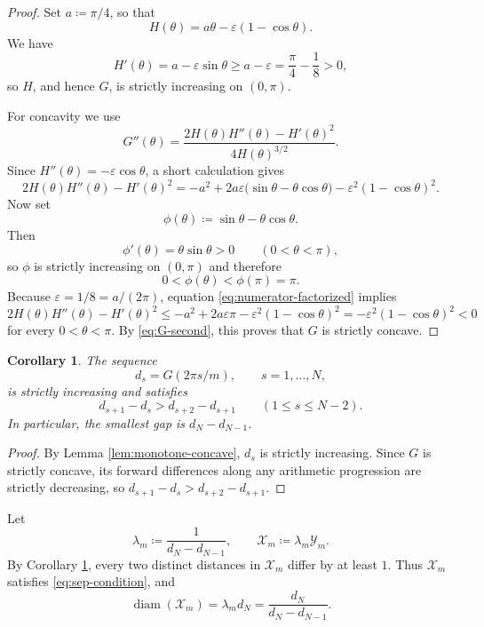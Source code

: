 \documentclass[twoside, reqno, 12pt]{amsart}
\newtheorem{corollary}[theorem]{Corollary}
\theoremstyle{definition}
\theoremstyle{remark}
\DeclareMathOperator{\diam}{diam}
\begin{document}
\begin{proof}
Set $a\coloneqq\pi/4$, so that
\[
H(\theta)=a\theta-\varepsilon(1-\cos\theta).
\]
We have
\[
H'(\theta)=a-\varepsilon\sin\theta\ge a-\varepsilon=\frac{\pi}{4}-\frac18>0,
\]
so $H$, and hence $G$, is strictly increasing on $(0,\pi)$.

For concavity we use
\begin{equation}\label{eq:G-second}
G''(\theta)=\frac{2H(\theta)H''(\theta)-H'(\theta)^2}{4H(\theta)^{3/2}}.
\end{equation}
Since $H''(\theta)=-\varepsilon\cos\theta$, a short calculation gives
\begin{equation}\label{eq:numerator-factorized}
2H(\theta)H''(\theta)-H'(\theta)^2
=-a^2+2a\varepsilon\bigl(\sin\theta-\theta\cos\theta\bigr)
-\varepsilon^2(1-\cos\theta)^2.
\end{equation}
Now set
\[
\phi(\theta)\coloneqq\sin\theta-\theta\cos\theta.
\]
Then
\[
\phi'(\theta)=\theta\sin\theta>0
\qquad (0<\theta<\pi),
\]
so $\phi$ is strictly increasing on $(0,\pi)$ and therefore
\[
0<\phi(\theta)<\phi(\pi)=\pi.
\]
Because $\varepsilon=1/8=a/(2\pi)$, equation
\eqref{eq:numerator-factorized} implies
\[
2H(\theta)H''(\theta)-H'(\theta)^2
\le -a^2+2a\varepsilon\pi-\varepsilon^2(1-\cos\theta)^2
=-\varepsilon^2(1-\cos\theta)^2<0
\]
for every $0<\theta<\pi$. By \eqref{eq:G-second}, this proves that $G$ is
strictly concave.
\end{proof}

\begin{corollary}\label{cor:smallest-gap}
The sequence
\[
 d_s=G(2\pi s/m),\qquad s=1,\dots,N,
\]
is strictly increasing and satisfies
\[
 d_{s+1}-d_s > d_{s+2}-d_{s+1}
 \qquad (1\le s\le N-2).
\]
In particular, the smallest gap is $d_N-d_{N-1}$.
\end{corollary}

\begin{proof}
By Lemma \ref{lem:monotone-concave}, $d_s$ is strictly increasing.
Since $G$ is strictly concave, its forward differences along any arithmetic 
progression are strictly decreasing, so $d_{s+1}-d_s>d_{s+2}-d_{s+1}$.
\end{proof}

Let
\[
\lambda_m\coloneqq\frac{1}{d_N-d_{N-1}},
\qquad
\mathcal X_m\coloneqq\lambda_m\mathcal Y_m.
\]
By Corollary \ref{cor:smallest-gap}, every two distinct distances in
$\mathcal X_m$ differ by at least $1$. Thus $\mathcal X_m$ satisfies
\eqref{eq:sep-condition}, and
\begin{equation}\label{eq:diam-lambda}
\diam(\mathcal X_m)=\lambda_m d_N=\frac{d_N}{d_N-d_{N-1}}.
\end{equation}
\end{document}
